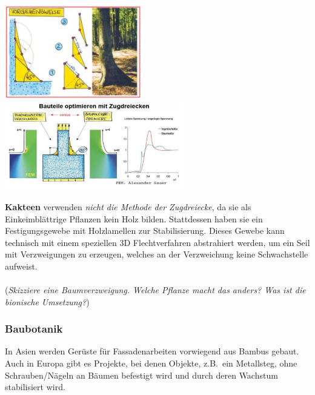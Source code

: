 \begin{center}
    \includegraphics[width=6cm]{lec7/figures/zugdreiecke.png}
    \hfill
    \includegraphics[width=8cm]{lec7/figures/kerbe.png}
\end{center}
\textbf{Kakteen} verwenden \textit{nicht die Methode der Zugdreiecke}, da sie als Einkeimblättrige Pflanzen kein Holz bilden.
Stattdessen haben sie ein Festigungsgewebe mit Holzlamellen zur Stabilisierung. Dieses Gewebe kann technisch mit einem speziellen 3D Flechtverfahren abstrahiert werden, um ein Seil mit Verzweigungen zu erzeugen, welches an der Verzweichung keine Schwachstelle aufweist.
\\\\
(\dangersign \textit{Skizziere eine Baumverzweigung. Welche Pflanze macht das anders? Was ist die bionische Umsetzung?})

\subsubsection{Baubotanik}

In Asien werden Gerüste für Fassadenarbeiten vorwiegend aus Bambus gebaut. Auch in Europa gibt es Projekte, bei denen Objekte, z.B.\ ein Metallsteg, ohne Schrauben/Nägeln an Bäumen befestigt wird und durch deren Wachstum stabilisiert wird.

